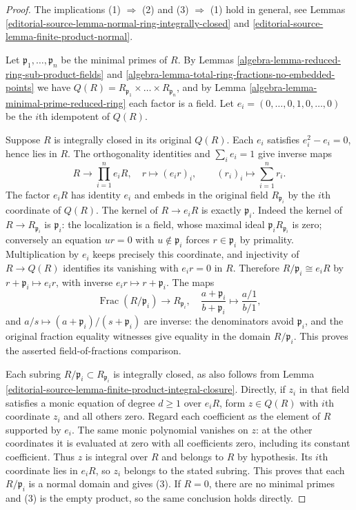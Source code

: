 \begin{proof}
The implications (1) $\Rightarrow$ (2) and
(3) $\Rightarrow$ (1) hold in general,
see Lemmas \ref{editorial-source-lemma-normal-ring-integrally-closed} and
\ref{editorial-source-lemma-finite-product-normal}.

\medskip\noindent
Let $\mathfrak p_1, \ldots, \mathfrak p_n$ be the minimal primes of $R$.
By Lemmas \ref{algebra-lemma-reduced-ring-sub-product-fields} and
\ref{algebra-lemma-total-ring-fractions-no-embedded-points} we have
$Q(R) = R_{\mathfrak p_1} \times \ldots \times R_{\mathfrak p_n}$, and
by Lemma \ref{algebra-lemma-minimal-prime-reduced-ring} each factor is a field.
Let $e_i = (0, \ldots, 0, 1, 0, \ldots, 0)$ be the $i$th idempotent
of $Q(R)$.

\medskip\noindent
Suppose $R$ is integrally closed in its original $Q(R)$.
Each $e_i$ satisfies $e_i^2-e_i=0$, hence lies in $R$.
The orthogonality identities and $\sum_i e_i=1$ give inverse maps
$$
R\longrightarrow\prod_{i=1}^n e_iR,\quad
r\longmapsto(e_ir)_i,
\qquad (r_i)_i\longmapsto\sum_{i=1}^n r_i.
$$
The factor $e_iR$ has identity $e_i$ and embeds in the original
field $R_{\mathfrak p_i}$ by the $i$th coordinate of $Q(R)$.
The kernel of $R\to e_iR$ is exactly $\mathfrak p_i$.
Indeed the kernel of $R\to R_{\mathfrak p_i}$ is
$\mathfrak p_i$: the localization is a field, whose maximal ideal
$\mathfrak p_iR_{\mathfrak p_i}$ is zero; conversely an equation
$ur=0$ with $u\notin\mathfrak p_i$ forces $r\in\mathfrak p_i$
by primality. Multiplication by $e_i$ keeps precisely this
coordinate, and injectivity of $R\to Q(R)$ identifies its
vanishing with $e_ir=0$ in $R$. Therefore
$R/\mathfrak p_i\cong e_iR$ by $r+\mathfrak p_i\mapsto e_ir$,
with inverse $e_ir\mapsto r+\mathfrak p_i$.
The maps
$$
\operatorname{Frac}(R/\mathfrak p_i)\longrightarrow R_{\mathfrak p_i},
\quad\frac{a+\mathfrak p_i}{b+\mathfrak p_i}
\longmapsto\frac{a/1}{b/1},
$$
and $a/s\mapsto(a+\mathfrak p_i)/(s+\mathfrak p_i)$ are inverse:
the denominators avoid $\mathfrak p_i$, and the original fraction
equality witnesses give equality in the domain $R/\mathfrak p_i$.
This proves the asserted field-of-fractions comparison.

Each subring $R/\mathfrak p_i\subset R_{\mathfrak p_i}$ is
integrally closed, as also follows from
Lemma \ref{editorial-source-lemma-finite-product-integral-closure}.
Directly, if $z_i$ in that field satisfies a monic equation of
degree $d\geq1$ over $e_iR$, form $z\in Q(R)$ with $i$th
coordinate $z_i$ and all others zero. Regard each coefficient
as the element of $R$ supported by $e_i$. The same monic
polynomial vanishes on $z$: at the other coordinates it is
evaluated at zero with all coefficients zero, including its
constant coefficient. Thus $z$ is integral over $R$ and belongs
to $R$ by hypothesis. Its $i$th coordinate lies in $e_iR$,
so $z_i$ belongs to the stated subring. This proves that each
$R/\mathfrak p_i$ is a normal domain and gives (3).
If $R=0$, there are no minimal primes and (3) is the empty
product, so the same conclusion holds directly.
\end{proof}

